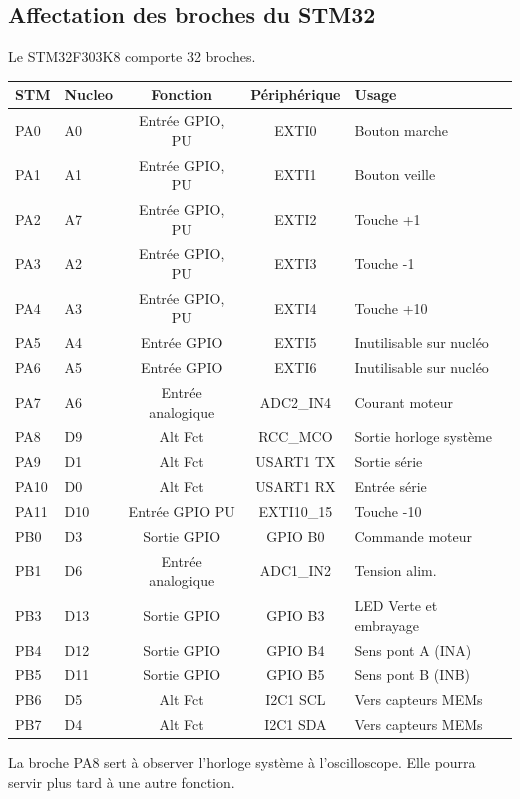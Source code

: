 \documentclass[a4paper,11pt]{report}
\begin{document}
\subsection{Affectation des broches du STM32}
Le STM32F303K8 comporte 32 broches.
\\

   \begin{tabular}{|l|l|c|c|l|}
   \hline
   STM & Nucleo& Fonction & Périphérique & Usage\\
   \hline
   PA0  & A0  & Entrée GPIO, PU   & EXTI0       & Bouton marche          \\
   PA1  & A1  & Entrée GPIO, PU   & EXTI1       & Bouton veille          \\
   PA2  & A7  & Entrée GPIO, PU   & EXTI2       & Touche +1              \\
   PA3  & A2  & Entrée GPIO, PU   & EXTI3       & Touche -1              \\
   PA4  & A3  & Entrée GPIO, PU   & EXTI4       & Touche +10             \\
   PA5  & A4  & Entrée GPIO       & EXTI5       & Inutilisable sur nucléo\\

   PA6  & A5  & Entrée GPIO       & EXTI6       & Inutilisable sur nucléo\\
   PA7  & A6  & Entrée analogique & ADC2\_IN4   & Courant moteur         \\
   PA8  & D9  & Alt Fct \no 0     & RCC\_MCO    & Sortie horloge système \\
   PA9  & D1  & Alt Fct \no 7     & USART1 TX   & Sortie série           \\
   PA10 & D0  & Alt Fct \no 7     & USART1 RX   & Entrée série           \\
   PA11 & D10 & Entrée GPIO PU    & EXTI10\_15  & Touche -10             \\
   PB0  & D3  & Sortie GPIO       & GPIO B0     & Commande moteur        \\
   PB1  & D6  & Entrée analogique & ADC1\_IN2   & Tension alim.          \\
   PB3  & D13 & Sortie GPIO       & GPIO B3     & LED Verte et embrayage \\
   PB4  & D12 & Sortie GPIO       & GPIO B4     & Sens pont A (INA)      \\
   PB5  & D11 & Sortie GPIO       & GPIO B5     & Sens pont B (INB)      \\
   PB6  & D5  & Alt Fct \no 4     & I2C1 SCL    & Vers capteurs MEMs     \\
   PB7  & D4  & Alt Fct \no 4     & I2C1 SDA    & Vers capteurs MEMs     \\
   \hline
\end{tabular}
   La broche PA8 sert à observer l'horloge système à l'oscilloscope. Elle pourra servir plus tard à une autre fonction.
\end{document}

